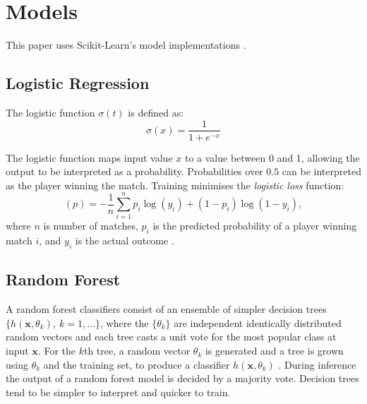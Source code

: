 \section{Models} \label{sec:models}

This paper uses Scikit-Learn's model implementations \cite{pedregosa2011scikit}.

\subsection{Logistic Regression}
The logistic function $\sigma(t)$ is defined as:
\begin{equation}
    \sigma(x) = \frac{1}{1+e^{-x}}
\end{equation}

The logistic function maps input value $x$ to a value between 0 and 1, allowing the output to be interpreted as a probability. Probabilities over $0.5$ can be interpreted as the player winning the match.  Training minimises the \textit{logistic loss} function:
\begin{equation}
    (p) = -\frac{1}{n} \sum_{i=1}^n p_i \log(y_i) + (1-p_i)\log(1-y_i), 
\end{equation}
where $n$ is number of matches, $p_i$ is the predicted probability of a player winning match $i$, and  $y_i$ is the actual outcome \cite{hazan2014logistic}. 


\subsection{Random Forest}
A random forest classifiers consist of an ensemble of simpler decision trees $\{h(\textbf{x},\theta_k),\ k=1,...\}$, where the $\{\theta_k\}$ are independent identically distributed random vectors and each tree casts a unit vote for the most popular class at input $\textbf{x}$. For the $k$th tree, a random vector $\theta_k$ is generated and a tree is grown using $\theta_k$ and the training set, to produce a classifier $h(\textbf{x}, \theta_k)$ \cite{breiman2001random}. During inference  the output of a random forest model is decided by a majority vote. Decision trees tend to be simpler to interpret and quicker to train.

